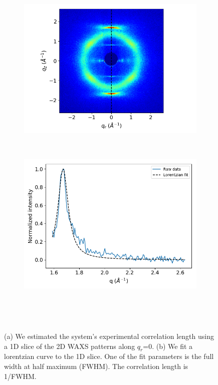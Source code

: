 \documentclass[journal=jpcbfk,manusciprt=article]{achemso}
\begin{document}
  \begin{figure}[!htb]
  \centering
  \begin{subfigure}{0.45\textwidth}	
  	\includegraphics[width=\textwidth]{waxs_dashed.png}
	\caption{}~\label{fig:waxs_dashed}
  \end{subfigure}
  \begin{subfigure}{0.45\textwidth}
	\includegraphics[width=\textwidth]{Correlation_length_exp.png}
	\caption{}~\label{fig:correlation_length_exp}
  \end{subfigure}
  \caption{(a) We estimated the system's experimental correlation length using a 
  1D slice of the 2D WAXS patterns along $q_r$=0. (b) We fit a lorentzian curve 
  to the 1D slice. One of the fit parameters is the full width at half maximum (FWHM).
  The correlation length is 1/FWHM.}~\label{fig:correlation}
  \end{figure}
  \vspace{1em} \\
\end{document}
